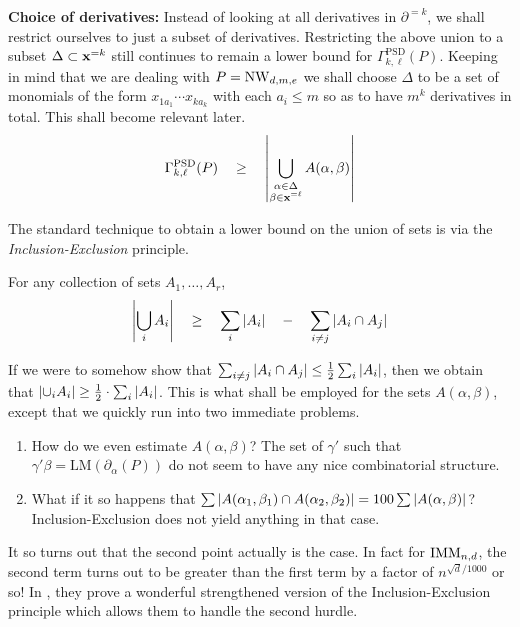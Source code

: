 \noindent
{\bf Choice of derivatives:} Instead of looking at all derivatives in  $\partial^{=k}$, we shall restrict ourselves to just a subset of derivatives. Restricting the above union to a subset $\Delta  \subset \mathbf{x}^{=k}$ still continues to remain a lower bound for $\Gamma^{\mathrm{PSD}}_{k,\ell}(P)$. Keeping in mind that we are dealing with $P = \operatorname{\mathrm{NW}}_{d,m,e}$ we shall choose $\Delta$ to be a set of monomials of the form $x_{1a_1}\cdots x_{ka_k}$ with each $a_i \leq m$ so as to have $m^k$ derivatives in total. This shall become relevant later. 
\begin{equation}\label{eqn:union-of-As}
\Gamma^{\mathrm{PSD}}_{k,\ell}(P) \quad \geq \quad \left|\bigcup_{\substack{\alpha \in \Delta \\\beta \in \mathbf{x}^{=\ell}}} A(\alpha, \beta)\right|
\end{equation}

The standard technique to obtain a lower bound on the union of sets is via the \emph{Inclusion-Exclusion} principle. 

\begin{lemma}\label{lem:inc-exc}
For any collection of sets $A_1,\dots, A_r$,
\[
\left|\bigcup_i A_i\right| \quad \geq \quad \sum_{i} \left|A_i\right| \quad - \quad \sum_{i\neq j}\left|A_i\cap A_j\right|
\]
\end{lemma}

If we were to somehow show that $\sum_{i\neq j}\left|A_i\cap A_j\right| \leq \frac{1}{2}\sum_i \left|A_i\right|$, then we obtain that $\left|\cup_i A_i\right| \geq \frac{1}{2}\cdot \sum_i \left|A_i\right|$. 
This is what shall be employed for the sets $A(\alpha, \beta)$, except that we quickly run into two immediate problems. 

\begin{enumerate}
  \item How do we even estimate $A(\alpha, \beta)$? The set of $\gamma'$ such that $\gamma' \beta = \mathrm{LM}(\partial_\alpha(P))$ do not seem to have any nice combinatorial structure. 
  \item What if it so happens that $\sum \left|A(\alpha_1,\beta_1)\cap A(\alpha_2,\beta_2)\right| = 100 \sum \left|A(\alpha,\beta)\right|$? Inclusion-Exclusion does not yield anything in that case. 
\end{enumerate}


It so turns out that the second point actually is the case. 
In fact for $\operatorname{\mathrm{IMM}}_{n,d}$, the second term turns out to be greater than the first term by a factor of $n^{\sqrt{d}/1000}$ or so! 
In \cite{KS14}, they prove a wonderful strengthened version of the Inclusion-Exclusion principle which allows them to handle the second hurdle. 

